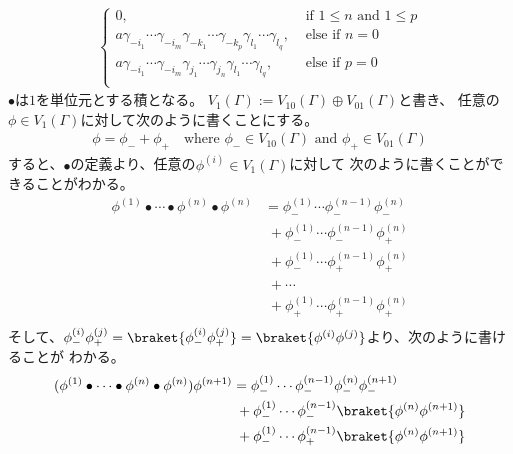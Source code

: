 {\begin{todo}[Wickの定理]
\begin{equation*}
\begin{split}
\begin{cases}
				0, &\text{ if } 1 \le n \text{ and } 1 \le p \\
				a \gamma_{-i_1}\cdots\gamma_{-i_m}
				\gamma_{-k_1}\cdots\gamma_{-k_p}
				\gamma_{l_1}\cdots\gamma_{l_q} , &\text{ else if } n = 0 \\
				a \gamma_{-i_1}\cdots\gamma_{-i_m}
				\gamma_{j_1}\cdots\gamma_{j_n}
				\gamma_{l_1}\cdots\gamma_{l_q} , &\text{ else if } p = 0 \\
			\end{cases}
		\end{split}\end{equation*}
		$\bullet$は$1$を単位元とする積となる。
		$V_1(\Gamma):=V_{10}(\Gamma)\oplus V_{01}(\Gamma)$と書き、
		任意の$\phi\in V_1(\Gamma)$に対して次のように書くことにする。
		\begin{equation*}\begin{split}
			\phi = \phi_- + \phi_+ \quad\text{where } \phi_-\in V_{10}(\Gamma)
			\text{ and } \phi_+\in V_{01}(\Gamma)
		\end{split}\end{equation*}
		すると、$\bullet$の定義より、任意の$\phi^{(i)}\in V_1(\Gamma)$に対して
		次のように書くことができることがわかる。
		\begin{equation*}\begin{split}
			\phi^{(1)}\bullet\cdots\bullet\phi^{(n)}\bullet\phi^{(n)}
			&= \phi_-^{(1)}\cdots\phi_-^{(n-1)}\phi_-^{(n)} \\
			&\; + \phi_-^{(1)}\cdots\phi_-^{(n-1)}\phi_+^{(n)} \\
			&\; + \phi_-^{(1)}\cdots\phi_+^{(n-1)}\phi_+^{(n)} \\
			&\; + \cdots \\
			&\; + \phi_+^{(1)}\cdots\phi_+^{(n-1)}\phi_+^{(n)} \\
		\end{split}\end{equation*}
		そして、$\phi_-^{(i)}\phi_+^{(j)}
		=\braket{\phi_-^{(i)}\phi_+^{(j)}}
		=\braket{\phi^{(i)}\phi^{(j)}}$より、次のように書けることが
		わかる。
		\begin{equation*}\begin{split}
			(\phi^{(1)}\bullet\cdots\bullet\phi^{(n)}\bullet\phi^{(n)})\phi^{(n+1)}
			&= \phi_-^{(1)}\cdots\phi_-^{(n-1)}\phi_-^{(n)}\phi_-^{(n+1)} \\
			&\;+ \phi_-^{(1)}\cdots\phi_-^{(n-1)}\braket{\phi^{(n)}\phi^{(n+1)}} \\
			&\;+ \phi_-^{(1)}\cdots\phi_+^{(n-1)}\braket{\phi^{(n)}\phi^{(n+1)}} \\

\end{split}
\end{equation*}
\end{todo}}
